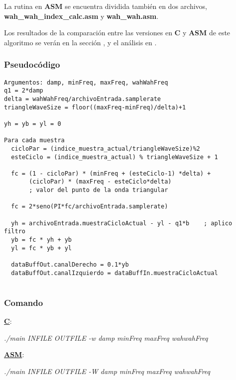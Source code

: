 La rutina en \textbf{ASM} se encuentra dividida también en dos archivos, \textbf{wah\_wah\_index\_calc.asm} y \textbf{wah\_wah.asm}.

\vspace{\baselineskip}

Los resultados de la comparación entre las versiones en \textbf{C} y \textbf{ASM} de este algoritmo se verán en la sección , y el análisis en .

\subsubsection{Pseudocódigo}
\label{subsec:desarrollo-wahwah-code}

\lstset{language=C}
\begin{lstlisting}[frame=single]
Argumentos: damp, minFreq, maxFreq, wahWahFreq
q1 = 2*damp
delta = wahWahFreq/archivoEntrada.samplerate	
triangleWaveSize = floor((maxFreq-minFreq)/delta)+1

yh = yb = yl = 0

Para cada muestra
  cicloPar = (indice_muestra_actual/triangleWaveSize)%2 
  esteCiclo = (indice_muestra_actual) % triangleWaveSize + 1
  
  fc = (1 - cicloPar) * (minFreq + (esteCiclo-1) *delta) +
	   (cicloPar) * (maxFreq - esteCiclo*delta)  
	   ; valor del punto de la onda triangular
  
  fc = 2*seno(PI*fc/archivoEntrada.samplerate)
  
  yh = archivoEntrada.muestraCicloActual - yl - q1*b	; aplico filtro
  yb = fc * yh + yb					
  yl = fc * yb + yl
  
  dataBuffOut.canalDerecho = 0.1*yb
  dataBuffOut.canalIzquierdo = dataBuffIn.muestraCicloActual
  
\end{lstlisting}

\subsubsection{Comando}
\label{subsec:desarrollo-wahwah-call}

\underline{\textbf{C}}:
\begin{center}
 \textit{./main INFILE OUTFILE -w damp minFreq maxFreq wahwahFreq}
\end{center}

\underline{\textbf{ASM}}:
\begin{center}
 \textit{./main INFILE OUTFILE -W damp minFreq maxFreq wahwahFreq}
\end{center}

